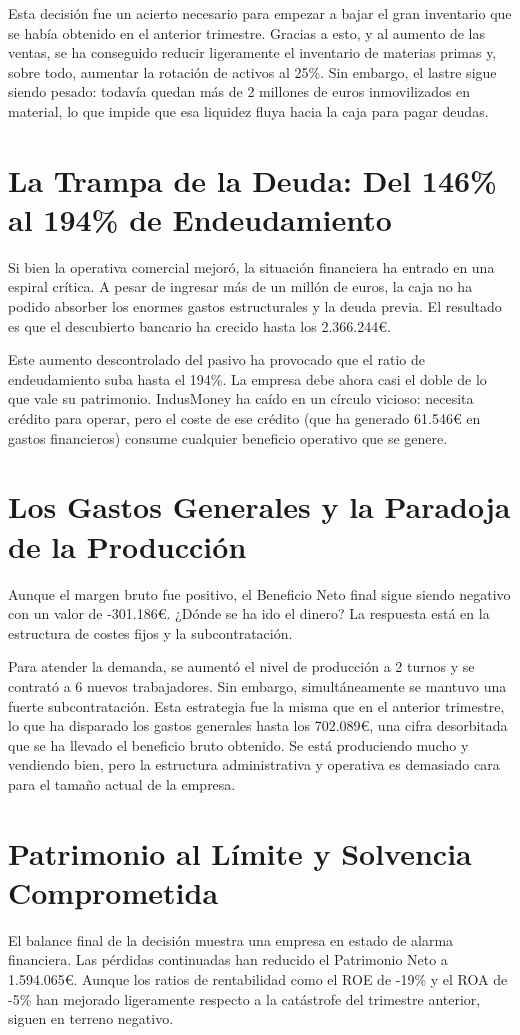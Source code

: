 Esta decisión fue un acierto necesario para empezar a bajar el gran inventario que se había obtenido en el anterior trimestre. Gracias a esto, y al aumento de las ventas, se ha conseguido reducir ligeramente el inventario de materias primas y, sobre todo, aumentar la rotación de activos al 25\%. Sin embargo, el lastre sigue siendo pesado: todavía quedan más de 2 millones de euros inmovilizados en material, lo que impide que esa liquidez fluya hacia la caja para pagar deudas.

\section*{La Trampa de la Deuda: Del 146\% al 194\% de Endeudamiento}
Si bien la operativa comercial mejoró, la situación financiera ha entrado en una espiral crítica. A pesar de ingresar más de un millón de euros, la caja no ha podido absorber los enormes gastos estructurales y la deuda previa. El resultado es que el descubierto bancario ha crecido hasta los 2.366.244€.

Este aumento descontrolado del pasivo ha provocado que el ratio de endeudamiento suba hasta el 194\%. La empresa debe ahora casi el doble de lo que vale su patrimonio. IndusMoney ha caído en un círculo vicioso: necesita crédito para operar, pero el coste de ese crédito (que ha generado 61.546€ en gastos financieros) consume cualquier beneficio operativo que se genere.

\section*{Los Gastos Generales y la Paradoja de la Producción}
Aunque el margen bruto fue positivo, el Beneficio Neto final sigue siendo negativo con un valor de -301.186€. ¿Dónde se ha ido el dinero? La respuesta está en la estructura de costes fijos y la subcontratación.

Para atender la demanda, se aumentó el nivel de producción a 2 turnos y se contrató a 6 nuevos trabajadores. Sin embargo, simultáneamente se mantuvo una fuerte subcontratación. Esta estrategia fue la misma que en el anterior trimestre, lo que ha disparado los gastos generales hasta los 702.089€, una cifra desorbitada que se ha llevado el beneficio bruto obtenido. Se está produciendo mucho y vendiendo bien, pero la estructura administrativa y operativa es demasiado cara para el tamaño actual de la empresa.

\section*{Patrimonio al Límite y Solvencia Comprometida}
El balance final de la decisión muestra una empresa en estado de alarma financiera. Las pérdidas continuadas han reducido el Patrimonio Neto a 1.594.065€. Aunque los ratios de rentabilidad como el ROE de -19\% y el ROA de -5\% han mejorado ligeramente respecto a la catástrofe del trimestre anterior, siguen en terreno negativo.

